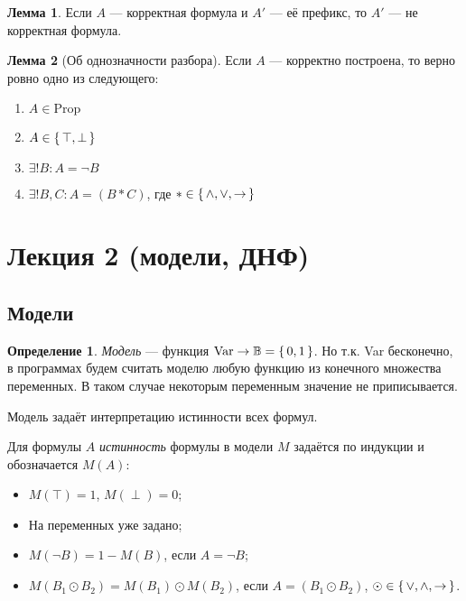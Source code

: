 \documentclass[12pt]{article}
\let\im\rightarrow
\let\la\land
\let\lv\lor
\let\n\neg
\theoremstyle{definition}
\newtheorem{definition}{Определение}[section]
\theoremstyle{statement}
\theoremstyle{theorem}
\newtheorem{lemma}{Лемма}[section]
\begin{document}
\begin{lemma}
  Если $A$ --- корректная формула и $A'$ --- её префикс, то $A'$ ---
  не корректная формула.
\end{lemma}

\begin{lemma}[Об однозначности разбора]
  Если $A$ --- корректно построена, то верно ровно одно из следующего:
  \begin{enumerate}
    \item $A \in \mathrm{Prop}$

    \item $A \in \set{\top, \perp}$

    \item $\exists! B \colon A = \n B$

    \item $\exists! B, C \colon A = (B * C)$, где $* \in \set{\la, \lv, \im}$
  \end{enumerate}
\end{lemma}

\pagebreak

\section{Лекция 2 (модели, ДНФ)}

\subsection{Модели}

\begin{definition}
  \textit{Модель} --- функция $\mathrm{Var} \to \mathbb{B} = \set{0,
  1}$. Но т.к. Var бесконечно, в программах будем считать моделю
  любую функцию из конечного множества переменных. В таком случае
  некоторым переменным значение не приписывается.
\end{definition}

Модель задаёт интерпретацию истинности всех формул.

Для формулы $A$ \textit{истинность} формулы в модели $M$ задаётся по
индукции и обозначается $M(A)$:
\begin{itemize}
  \item $M(\top) = 1$, $M(\perp) = 0$;

  \item На переменных уже задано;

  \item $M(\n B) = 1 - M(B)$, если $A = \n B$;

  \item $M(B_1 \odot B_2) = M(B_1) \odot M(B_2)$, если $A = (B_1
    \odot B_2)$, $\odot \in \set{\lor, \land, \im}$.
\end{itemize}
\end{document}
